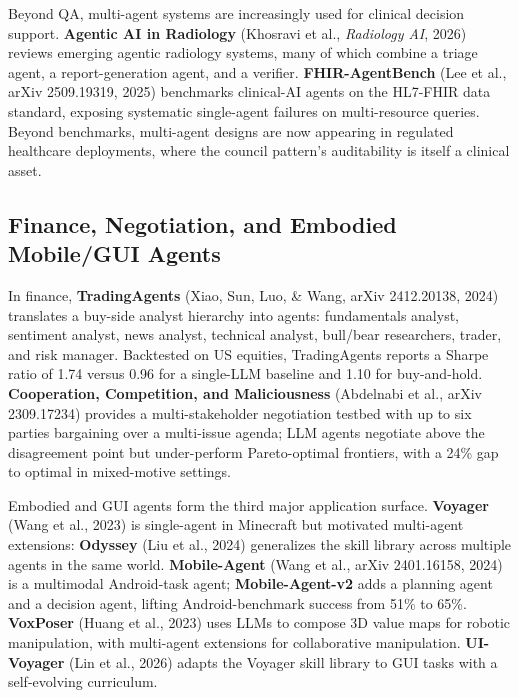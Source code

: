 Beyond QA, multi-agent systems are increasingly used for clinical decision support. \textbf{Agentic AI in Radiology} (Khosravi et al., \emph{Radiology AI}, 2026) reviews emerging agentic radiology systems, many of which combine a triage agent, a report-generation agent, and a verifier. \textbf{FHIR-AgentBench} (Lee et al., arXiv 2509.19319, 2025) benchmarks clinical-AI agents on the HL7-FHIR data standard, exposing systematic single-agent failures on multi-resource queries. Beyond benchmarks, multi-agent designs are now appearing in regulated healthcare deployments, where the council pattern's auditability is itself a clinical asset.

\subsection{Finance, Negotiation, and Embodied Mobile/GUI Agents}\label{finance-negotiation-and-embodied-mobilegui-agents}

In finance, \textbf{TradingAgents} (Xiao, Sun, Luo, \& Wang, arXiv 2412.20138, 2024) translates a buy-side analyst hierarchy into agents: fundamentals analyst, sentiment analyst, news analyst, technical analyst, bull/bear researchers, trader, and risk manager. Backtested on US equities, TradingAgents reports a Sharpe ratio of 1.74 versus 0.96 for a single-LLM baseline and 1.10 for buy-and-hold. \textbf{Cooperation, Competition, and Maliciousness} (Abdelnabi et al., arXiv 2309.17234) provides a multi-stakeholder negotiation testbed with up to six parties bargaining over a multi-issue agenda; LLM agents negotiate above the disagreement point but under-perform Pareto-optimal frontiers, with a 24\% gap to optimal in mixed-motive settings.

Embodied and GUI agents form the third major application surface. \textbf{Voyager} (Wang et al., 2023) is single-agent in Minecraft but motivated multi-agent extensions: \textbf{Odyssey} (Liu et al., 2024) generalizes the skill library across multiple agents in the same world. \textbf{Mobile-Agent} (Wang et al., arXiv 2401.16158, 2024) is a multimodal Android-task agent; \textbf{Mobile-Agent-v2} adds a planning agent and a decision agent, lifting Android-benchmark success from 51\% to 65\%. \textbf{VoxPoser} (Huang et al., 2023) uses LLMs to compose 3D value maps for robotic manipulation, with multi-agent extensions for collaborative manipulation. \textbf{UI-Voyager} (Lin et al., 2026) adapts the Voyager skill library to GUI tasks with a self-evolving curriculum.

